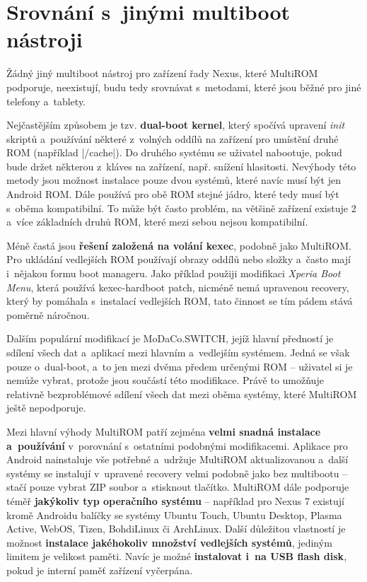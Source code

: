 \documentclass[12pt, a4paper, oneside]{article}
\newcommand{\B}{\textbf} %
\newcommand{\It}{\textit}  %
\begin{document}
\linespread{1.3}

\section{Srovnání s~jinými multiboot nástroji}
Žádný jiný multiboot nástroj pro zařízení řady Nexus, které MultiROM podporuje, neexistují, budu tedy srovnávat s~metodami, které jsou běžné pro jiné telefony a~tablety.

Nejčastějším způsobem je tzv. \B{dual-boot kernel}, který spočívá upravení \It{init} skriptů a~používání některé z~volných oddílů na zařízení pro umístění druhé ROM (například |/cache|). Do druhého systému se uživatel nabootuje, pokud bude držet některou z~kláves na zařízení, např. snížení hlasitosti. Nevýhody této metody jsou možnost instalace pouze dvou systémů, které navíc musí být jen Android ROM. Dále používá pro obě ROM stejné jádro, které tedy musí být s~oběma kompatibilní. To může být často problém, na většině zařízení existuje 2 a~více základních druhů ROM, které mezi sebou nejsou kompatibilní.

Méně častá jsou \B{řešení založená na volání kexec}, podobně jako MultiROM. Pro ukládání vedlejších ROM používají obrazy oddílů nebo složky a~často mají i~nějakou formu boot manageru. Jako příklad použiji modifikaci \It{Xperia Boot Menu}\cite{xperia-boot-menu}, která používá kexec-hardboot patch, nicméně nemá upravenou recovery, který by pomáhala s~instalací vedlejších ROM, tato činnost se tím pádem stává poměrně náročnou.

Dalším populární modifikací je MoDaCo.SWITCH\cite{modaco-switch}, jejíž hlavní předností je sdílení všech dat a~aplikací mezi hlavním a~vedlejším systémem. Jedná se však pouze o~dual-boot, a~to jen mezi dvěma předem určenými ROM -- uživatel si je nemůže vybrat, protože jsou součástí této modifikace. Právě to umožňuje relativně bezproblémové sdílení všech dat mezi oběma systémy, které MultiROM ještě nepodporuje.

Mezi hlavní výhody MultiROM patří zejména \B{velmi snadná instalace a~používání} v~porovnání s~ostatními podobnými modifikacemi. Aplikace pro Android nainstaluje vše potřebné a~udržuje MultiROM aktualizovanou a~další systémy se instalují v~upravené recovery velmi podobně jako bez multibootu -- stačí pouze vybrat ZIP soubor a~stisknout tlačítko. MultiROM dále podporuje téměř \B{jakýkoliv typ operačního systému} -- například pro Nexus 7 existují kromě Androidu balíčky se systémy Ubuntu Touch, Ubuntu Desktop, Plasma Active, WebOS, Tizen, BohdiLinux či ArchLinux. Další důležitou vlastností je možnost \B{instalace jakéhokoliv množství vedlejších systémů}, jediným limitem je velikost paměti. Navíc je možné \B{instalovat i~na USB flash disk}, pokud je interní paměť zařízení vyčerpána.
\end{document}
